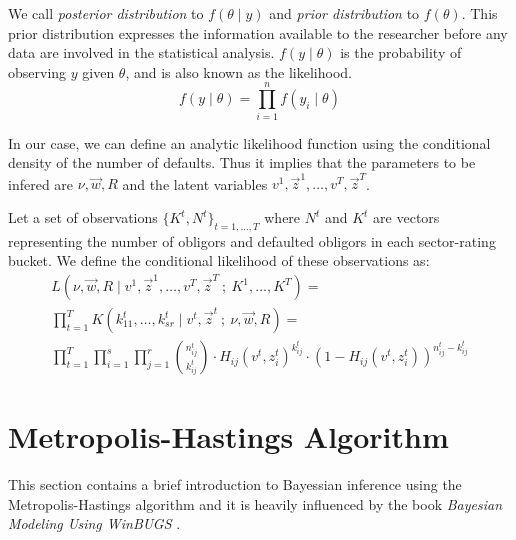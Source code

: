 \documentclass[11pt,fleqn]{book} %
\begin{document}
We call \emph{posterior distribution} to $f(\theta \mid y)$ and 
\emph{prior distribution} to $f(\theta)$. This prior distribution 
expresses the information available to the researcher before 
any data are involved in the statistical analysis. $f(y \mid \theta)$ 
is the probability of observing $y$ given $\theta$, and is also 
known as the likelihood.
\begin{displaymath}
	f(y \mid \theta) = \prod_{i=1}^n f(y_i \mid \theta)
\end{displaymath}

In our case, we can define an analytic likelihood function using the 
conditional density of the number of defaults. Thus it implies that 
the parameters to be infered are $\nu,\vec{w},R$ and the latent 
variables $v^1,\vec{z}^1,\dots,v^T,\vec{z}^T$.

\begin{definition}
Let a set of observations $\{K^t, N^t\}_{t=1,\dots,T}$ where $N^t$ 
and $K^t$ are vectors representing the number of obligors and defaulted 
obligors in each sector-rating bucket. We define the conditional 
likelihood of these observations as:
\begin{displaymath}
	\begin{array}{l}
		L(\nu,\vec{w},R \mid v^1,\vec{z}^1,\dots,v^T,\vec{z}^T\ ;\ K^1,\dots,K^T) = \\
		\displaystyle \prod_{t=1}^T K(k_{11}^t,\dots,k_{sr}^t \mid v^t,\vec{z}^t\ ;\ \nu,\vec{w},R) = \\
		\displaystyle
		\prod_{t=1}^T \prod_{i=1}^s \prod_{j=1}^r 
		\binom{n_{ij}^t}{k_{ij}^t} \cdot
		H_{ij}(v^t,z_i^t)^{k_{ij}^t} \cdot
		\left( 1 - H_{ij}(v^t,z_i^t) \right)^{n_{ij}^t-k_{ij}^t}
	\end{array}
\end{displaymath}
\end{definition}

\section{Metropolis-Hastings Algorithm}

This section contains a brief introduction to Bayessian inference using the 
Metropolis-Hastings algorithm and it is heavily influenced by the book 
\emph{Bayesian Modeling Using WinBUGS} \cite{ntzoufras:2009}.
\end{document}
